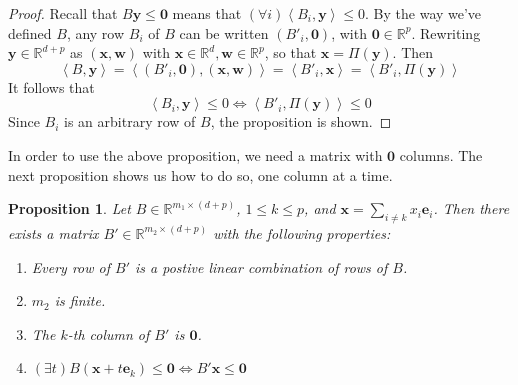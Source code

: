 \documentclass[fleqn]{article}
\renewcommand{\vec}[1]{\mathbf{#1}}
\newcommand{\ip}[2]{\left\langle #1, #2 \right\rangle}
\newcommand{\R}{\mathbb{R}}
\newcommand{\0}{\vec{0}}
\newcommand{\x}{\vec{x}}
\newcommand{\y}{\vec{y}}
\newcommand{\e}{\vec{e}}
\newcommand{\w}{\vec{w}}
\newcommand{\Udim}{p}
\newcommand{\mspaceB}{\R^{m_1\times (d+\Udim)}}
\newcommand{\mspaceC}{\R^{m_2\times (d+\Udim)}}
\newcommand{\mB}{B \in \mspaceB}
\newcommand{\mC}{B' \in \mspaceC}
\newtheorem{Prop}{Proposition}
\begin{document}
\begin{proof}
  Recall that $B\y \leq \0$ means that $(\forall i)\ip{B_i}{\y} \leq 0$.  By the way we've defined $B$, any row $B_i$ of $B$ can be written $(B'_i,\0)$, with $\0 \in \R^\Udim$.  Rewriting $\y\in\R^{d+\Udim}$ as $(\x,\w)$ with $\x\in\R^d,\w\in\R^\Udim$, so that $\x = \Pi(\y)$.  Then
  \[ \ip{B}{\y} = \ip{(B'_i,\0)}{(\x,\w)} = \ip{B'_i}{\x} = \ip{B'_i}{\Pi(\y)} \]
  It follows that
  \[ \ip{B_i}{\y} \leq 0 \Leftrightarrow \ip{B'_i}{\Pi(\y)} \leq 0 \]
  Since $B_i$ is an arbitrary row of $B$, the proposition is shown.
\end{proof}

In order to use the above proposition, we need a matrix with $\0$ columns.  The next proposition shows us how to do so, one column at a time.

\begin{Prop}{\label{prop:hconeproj}
Let $\mB$, $1 \leq k \leq p$, and $\x = \sum_{i\neq k}x_i \e_i$.  Then there exists a matrix $\mC$ with the following properties:
  \begin{enumerate}
    \item Every row of $B'$ is a postive linear combination of rows of $B$.
    \item $m_2$ is finite.
    \item The $k$-th column of $B'$ is $\0$.
    \item \((\exists t)B(\x + t\e_k) \leq \0 \Leftrightarrow B'\x \leq \0\)
  \end{enumerate}
}\end{Prop}
\newcommand{\Bik}{B^k_i}
\newcommand{\Bjk}{B^k_j}
\newcommand{\Blk}{B^k_l}
\end{document}
